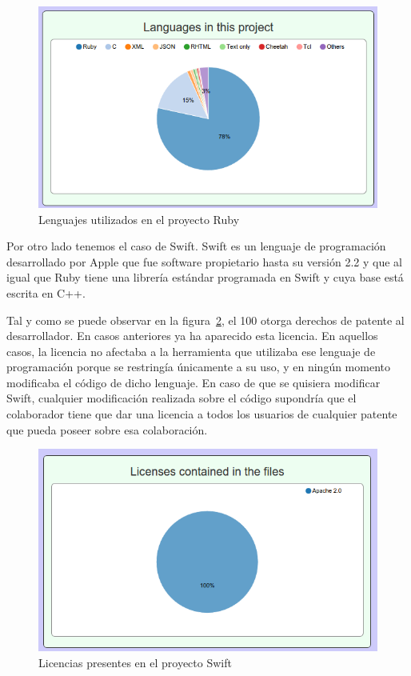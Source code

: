 \documentclass[a4paper, spanish, 12pt]{book}
\begin{document}
\begin{figure}
	\centering
	\includegraphics[width=14cm, keepaspectratio]{img/languages_ruby}
	\caption{Lenguajes utilizados en el proyecto Ruby}
	\label{fig:ruby_lang}
\end{figure}

Por otro lado tenemos el caso de Swift. Swift es un lenguaje de programaci\'on desarrollado por Apple que fue software
propietario hasta su versi\'on 2.2 y que al igual que Ruby tiene una librer\'ia est\'andar programada en Swift y cuya
base est\'a escrita en C++.

Tal y como se puede observar en la figura~\ref{fig:swift_license}, el 100%
otorga derechos de patente al desarrollador. En casos anteriores ya ha aparecido esta licencia. En aquellos casos,
la licencia no afectaba a la herramienta que utilizaba ese lenguaje de programaci\'on porque
se restring\'ia \'unicamente a su uso, y en ning\'un momento modificaba el c\'odigo de dicho lenguaje.
En caso de que se quisiera modificar Swift, cualquier modificaci\'on realizada sobre el c\'odigo supondr\'ia que
el colaborador tiene que dar una licencia a todos los usuarios de cualquier patente que pueda poseer sobre esa
colaboraci\'on.

\begin{figure}
	\centering
	\includegraphics[width=14cm, keepaspectratio]{img/licenses_swift}
	\caption{Licencias presentes en el proyecto Swift}
	\label{fig:swift_license}
\end{figure}
\end{document}
